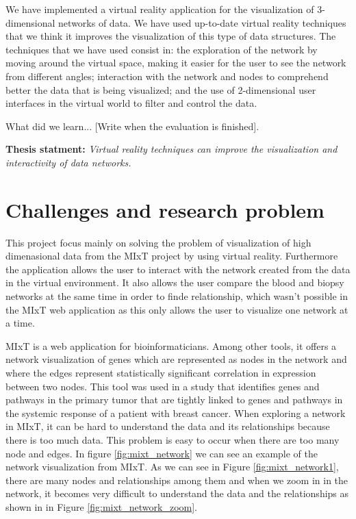 We have implemented a virtual reality application for the visualization of 3-dimensional networks of data. We have used  up-to-date virtual reality techniques that we think it improves the visualization of this type of data structures. The techniques that we have used consist in: the exploration of the network by moving around the virtual space, making it easier for the user to see the network from different angles; interaction with the network and nodes to comprehend better the data that is being visualized; and the use of 2-dimensional user interfaces in the virtual world to filter and control the data.

What did we learn... [Write when the evaluation is finished].

\textbf{Thesis statment: } \emph{Virtual reality techniques can improve the visualization and interactivity of data networks.}

\section{Challenges and research problem}
This project focus mainly on solving the problem of visualization of high dimenasional data from the MIxT project by using virtual reality. Furthermore the application allows the user to interact with the network created from the data in the virtual environment. It also allows the user compare the blood and biopsy networks at the same time in order to finde relationship, which wasn't possible in the MIxT web application as this only allows the user to visualize one network at a time.

MIxT\cite{fjukstad_dumeaux_olsen_lund_hallett_bongo_2017} is a web application for bioinformaticians. Among other tools, it offers a network visualization of genes which are represented as nodes in the network and where the edges represent statistically significant correlation in expression between two nodes. This tool was used in a study\cite{dumeaux_fjukstad_interactions_tumor_blood} that identifies genes and pathways in the primary tumor that are tightly linked to genes and pathways in the systemic response of a patient with breast cancer.
When exploring a network in MIxT, it can be hard to understand the data and its relationships because there is too much data. This problem is easy to occur when there are too many node and edges. In figure \ref{fig:mixt_network} we can see an example of the network visualization from MIxT. As we can see in Figure \ref{fig:mixt_network1}, there are many nodes and relationships among them and when we zoom in in the network, it becomes very difficult to understand the data and the relationships as shown in in Figure \ref{fig:mixt_network_zoom}.

